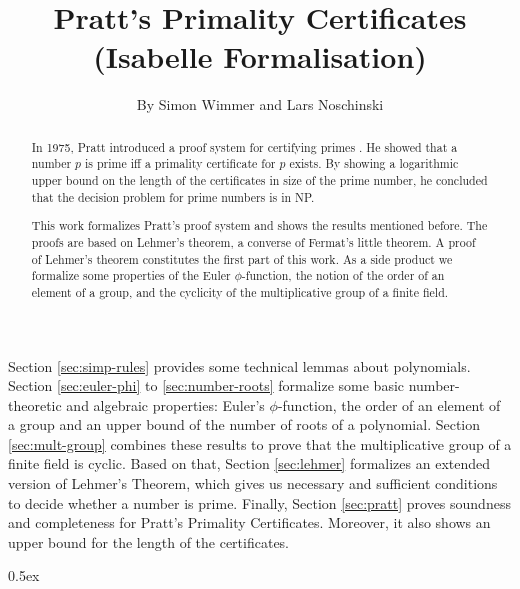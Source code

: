 \documentclass[11pt,a4paper]{article}
\begin{document}
\title{Pratt's Primality Certificates \\ (Isabelle Formalisation)}
\author{By Simon Wimmer and Lars Noschinski}
\maketitle

\begin{abstract}
  In 1975, Pratt introduced a proof system for certifying primes
  \cite{pratt1975certificate}.
  He showed that a number $p$ is prime iff a primality certificate for $p$ exists.
  By showing a logarithmic upper bound on the length of the certificates in size of the prime number,
  he concluded that the decision problem for prime numbers is in NP.

  This work formalizes Pratt's proof system and shows the results mentioned before.  
  The proofs are based on Lehmer's theorem, a converse of Fermat's little theorem.
  A proof of Lehmer's theorem constitutes the first part of this work.
  As a side product we formalize
  some properties of the Euler $\phi$-function,
  the notion of the order of an element of a group,
  and the cyclicity of the multiplicative group of a finite field.
\end{abstract}

\tableofcontents

Section \ref{sec:simp-rules} provides some technical lemmas about polynomials.
Section \ref{sec:euler-phi} to \ref{sec:number-roots} formalize some basic number-theoretic
and algebraic properties: Euler's $\phi$-function, the order of an element of a group
and an upper bound of the number of roots of a polynomial. Section \ref{sec:mult-group}
combines these results to prove that the multiplicative group of a finite field is cyclic.
Based on that, Section \ref{sec:lehmer} formalizes an extended version of Lehmer's Theorem,
which gives us necessary and sufficient conditions to decide whether a number is prime.
Finally, Section \ref{sec:pratt} proves soundness and completeness for Pratt's Primality
Certificates. Moreover, it also shows an upper bound for the length of the certificates.

\parindent 0pt\parskip 0.5ex



\nocite{*}



\end{document}
